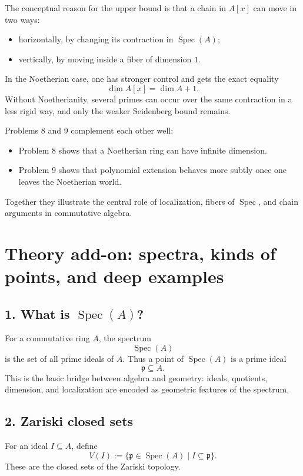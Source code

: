 \documentclass[12pt,a4paper]{article}
\theoremstyle{plain}
\theoremstyle{definition}      %
\begin{document}
\medskip

The conceptual reason for the upper bound is that a chain in \(A[x]\) can move in two ways:
\begin{itemize}
	\item horizontally, by changing its contraction in \(\operatorname{Spec}(A)\);
	\item vertically, by moving inside a fiber of dimension \(1\).
\end{itemize}
In the Noetherian case, one has stronger control and gets the exact equality
\[
\dim A[x]=\dim A+1.
\]
Without Noetherianity, several primes can occur over the same contraction in a less rigid way, and only the weaker Seidenberg bound remains.

\medskip

Problems 8 and 9 complement each other well:
\begin{itemize}
	\item Problem 8 shows that a Noetherian ring can have infinite dimension.
	\item Problem 9 shows that polynomial extension behaves more subtly once one leaves the Noetherian world.
\end{itemize}
Together they illustrate the central role of localization, fibers of \(\operatorname{Spec}\), and chain arguments in commutative algebra.


\section*{Theory add-on: spectra, kinds of points, and deep examples}

\subsection*{1. What is \(\operatorname{Spec}(A)\)?}

For a commutative ring \(A\), the spectrum
\[
\operatorname{Spec}(A)
\]
is the set of all prime ideals of \(A\). Thus a point of \(\operatorname{Spec}(A)\) is a prime ideal
\[
\mathfrak p\subseteq A.
\]
This is the basic bridge between algebra and geometry: ideals, quotients, dimension, and localization are encoded as geometric features of the spectrum.

\subsection*{2. Zariski closed sets}

For an ideal \(I\subseteq A\), define
\[
V(I):=\{\mathfrak p\in \operatorname{Spec}(A)\mid I\subseteq \mathfrak p\}.
\]
These are the closed sets of the Zariski topology.
\end{document}
